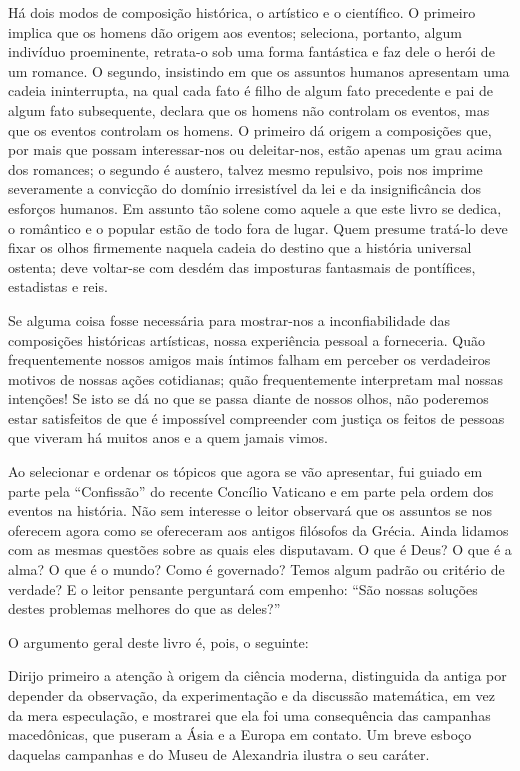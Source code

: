 \documentclass[11pt,a5paper,twoside,openany]{book}
\begin{document}
Há dois modos de composição histórica, o artístico e o científico. O primeiro implica que os homens dão origem aos eventos; seleciona, portanto, algum indivíduo proeminente, retrata-o sob uma forma fantástica e faz dele o herói de um romance. O segundo, insistindo em que os assuntos humanos apresentam uma cadeia ininterrupta, na qual cada fato é filho de algum fato precedente e pai de algum fato subsequente, declara que os homens não controlam os eventos, mas que os eventos controlam os homens. O primeiro dá origem a composições que, por mais que possam interessar-nos ou deleitar-nos, estão apenas um grau acima dos romances; o segundo é austero, talvez mesmo repulsivo, pois nos imprime severamente a convicção do domínio irresistível da lei e da insignificância dos esforços humanos. Em assunto tão solene como aquele a que este livro se dedica, o romântico e o popular estão de todo fora de lugar. Quem presume tratá-lo deve fixar os olhos firmemente naquela cadeia do destino que a história universal ostenta; deve voltar-se com desdém das imposturas fantasmais de pontífices, estadistas e reis.

Se alguma coisa fosse necessária para mostrar-nos a inconfiabilidade das composições históricas artísticas, nossa experiência pessoal a forneceria. Quão frequentemente nossos amigos mais íntimos falham em perceber os verdadeiros motivos de nossas ações cotidianas; quão frequentemente interpretam mal nossas intenções! Se isto se dá no que se passa diante de nossos olhos, não poderemos estar satisfeitos de que é impossível compreender com justiça os feitos de pessoas que viveram há muitos anos e a quem jamais vimos.

Ao selecionar e ordenar os tópicos que agora se vão apresentar, fui guiado em parte pela “Confissão” do recente Concílio Vaticano e em parte pela ordem dos eventos na história. Não sem interesse o leitor observará que os assuntos se nos oferecem agora como se ofereceram aos antigos filósofos da Grécia. Ainda lidamos com as mesmas questões sobre as quais eles disputavam. O que é Deus? O que é a alma? O que é o mundo? Como é governado? Temos algum padrão ou critério de verdade? E o leitor pensante perguntará com empenho: “São nossas soluções destes problemas melhores do que as deles?”

O argumento geral deste livro é, pois, o seguinte:

Dirijo primeiro a atenção à origem da ciência moderna, distinguida da antiga por depender da observação, da experimentação e da discussão matemática, em vez da mera especulação, e mostrarei que ela foi uma consequência das campanhas macedônicas, que puseram a Ásia e a Europa em contato. Um breve esboço daquelas campanhas e do Museu de Alexandria ilustra o seu caráter.
\end{document}

